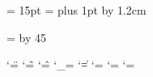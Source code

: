 \begin{\parsearg\beginxxx}
{{}%



\def\openindices{%
   \newindex{cp}%
   \newcodeindex{fn}%
   \newcodeindex{vr}%
   \newcodeindex{tp}%
   \newcodeindex{ky}%
   \newcodeindex{pg}%
}


\newdimen{} {} = 15pt
\parindent = 
\parskip 18pt plus 1pt
\baselineskip 15pt
\advance\topskip by 1.2cm


% 
\ifx\emergencystretch\thisisundefined \else
  \emergencystretch = \hsize
  \divide\emergencystretch by 45
\fi

\def\smallbook{
\global\lispnarrowing = 0.3in
\global\baselineskip 12pt
\global\parskip 3pt plus 1pt
\global\hsize = 5in
\global\doublecolumnhsize=2.4in \global\doublecolumnvsize=15.0in
\global\vsize=7.5in
\global\tolerance=700
\global\hfuzz=1pt

\global\pagewidth=\hsize
\global\pageheight=\vsize

\global\let\smalllisp=\smalllispx
\global\let\smallexample=\smalllispx
\global\def\Esmallexample{\Esmalllisp}
}

\def\finalout{\overfullrule=0pt}

\catcode`\"=\other
\catcode`\~=\other
\catcode`\^=\other
\catcode`\_=\other
\catcode`\|=\other
\catcode`\<=\other
\catcode`\>=\other
\catcode`\+=\other
\def\normaldoublequote{"}
\def\normaltilde{~}
\def\normalcaret{^}
\def\normalunderscore{_}
\def\normalverticalbar{|}
\def\normalless{<}
\def\normalgreater{>}
\def\normalplus{+}

%
% 
\def\ifusingtt#1#2{\ifdim \fontdimen3\the\font=0pt #1\else #2\fi}

}
\end{\parsearg\beginxxx}
